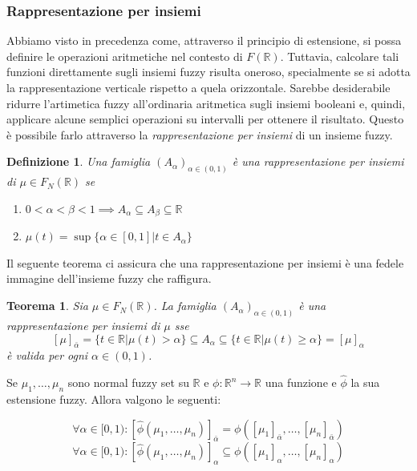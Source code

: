 \documentclass[10pt,a4paper]{article}
\newtheorem{definition}{Definizione}
\newtheorem{theorem}{Teorema}
\begin{document}
\subsubsection{Rappresentazione per insiemi}

Abbiamo visto in precedenza come, attraverso il principio di estensione, si possa definire le operazioni aritmetiche nel contesto di $F(\mathbb{R})$. Tuttavia, calcolare tali funzioni direttamente sugli insiemi fuzzy risulta oneroso, specialmente se si adotta la rappresentazione verticale rispetto a quela orizzontale. Sarebbe desiderabile ridurre l'artimetica fuzzy all'ordinaria aritmetica sugli insiemi booleani e, quindi, applicare alcune semplici operazioni su intervalli per ottenere il risultato. Questo è possibile farlo attraverso la \emph{rappresentazione per insiemi} di un insieme fuzzy.

\newpage

\begin{definition}
Una famiglia $(A_\alpha)_{\alpha \in (0,1)}$ è una \emph{rappresentazione per insiemi} di $\mu \in F_N(\mathbb{R})$ se
\begin{enumerate}
\item{$0 < \alpha < \beta < 1 \implies A_\alpha \subseteq A_\beta \subseteq \mathbb{R}$}
\item{$\mu(t) = \sup \{ \alpha \in [0,1] | t \in A_\alpha \} $}
\end{enumerate} 
\end{definition}

Il seguente teorema ci assicura che una rappresentazione per insiemi è una fedele immagine dell'insieme fuzzy che raffigura.

\begin{theorem}
Sia $\mu \in F_N(\mathbb{R})$. La famiglia $(A_\alpha)_{\alpha \in (0,1)}$ è una rappresentazione per insiemi di $\mu$ sse 
$$
[\mu]_{\bar{\alpha}} = \{ t \in \mathbb{R} | \mu(t) > \alpha \} \subseteq A_\alpha \subseteq \{ t \in \mathbb{R} | \mu(t) \geq \alpha \} = [\mu]_\alpha
$$
è valida per ogni $\alpha \in (0,1)$.
\end{theorem}

Se $\mu_1, \dots, \mu_n$ sono normal fuzzy set su $\mathbb{R}$ e $\phi: \mathbb{R}^n \to \mathbb{R}$ una funzione e $\hat{\phi}$ la sua estensione fuzzy. Allora valgono le seguenti:

$$
\forall \alpha \in [0,1) : [\hat{\phi}(\mu_1,\dots,\mu_n)]_{\bar{\alpha}} = \phi([\mu_1]_{\bar{\alpha}}, \dots, [\mu_n]_{\bar{\alpha}})
$$
$$
\forall \alpha \in [0,1) : [\hat{\phi}(\mu_1,\dots,\mu_n)]_\alpha \subseteq \phi([\mu_1]_\alpha, \dots, [\mu_n]_\alpha)
$$
\end{document}
